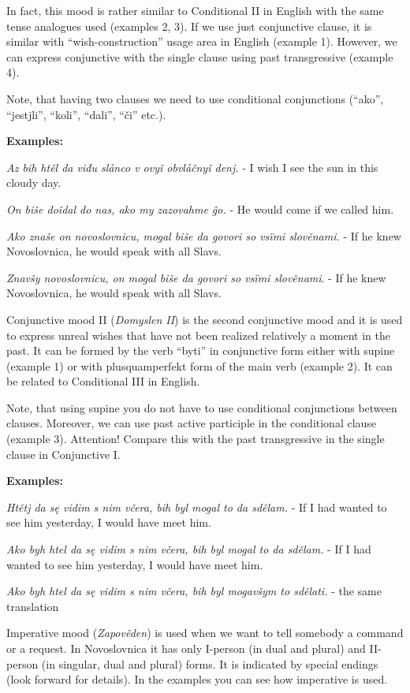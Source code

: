 In fact, this mood is rather similar to Conditional II in English with the same tense analogues used (examples 2, 3). If we use just conjunctive clause, it is similar with “wish-construction” usage area in English (example 1). However, we can express conjunctive with the single clause using past transgressive (example 4).

Note, that having two clauses we need to use conditional conjunctions (“ako”, “jestjli”, “koli”, “dali”, “či” etc.).

\textbf{Examples:}

\textit{Az bih htěl da viđu slånco v ovyǐ obvlåčnyǐ denj.} - I wish I see the sun in this cloudy day.

\textit{On biše doǐdal do nas, ako my zazovahme ĝo.} - He would come if we called him.

\textit{Ako znaše on novoslovnicu, mogal biše da govori so vsïmi slověnami.} - If he knew Novoslovnica, he would speak with all Slavs.

\textit{Znavšy novoslovnicu, on mogal biše da govori so vsïmi slověnami}. - If he knew Novoslovnica, he would speak with all Slavs.

Conjunctive mood II (\textit{Domyslen II}) is the second conjunctive mood and it is used to express unreal wishes that have not been realized relatively a moment in the past. It can be formed by the verb “byti” in conjunctive form either  with supine (example 1) or with plusquamperfekt form of the main verb (example 2). It can be related to Conditional III in English. 

Note, that using supine you do not have to use conditional conjunctions between clauses. Moreover, we can use past active participle in the conditional clause (example 3). Attention! Compare this with the past transgressive in the single clause in Conjunctive I.

\textbf{Examples:}

\textit{Htětj da sę vidim s nim včera, bih byl mogal to da sdělam.} - If  I had wanted to see him yesterday, I would have meet him.

\textit{Ako byh htel da sę vidim s nim včera, bih byl mogal to da sdělam.} - If  I had wanted to see him yesterday, I would have meet him.

\textit{Ako byh htel da sę vidim s nim včera, bih byl mogavšym to sdělati.} - the same translation

Imperative mood (\textit{Zapověden})  is used when we want to tell somebody a command or a request. In Novoslovnica it has only I-person (in dual and plural) and II-person (in singular, dual and plural) forms. It is indicated by special endings (look forward for details). In the examples you can see how imperative is used.

